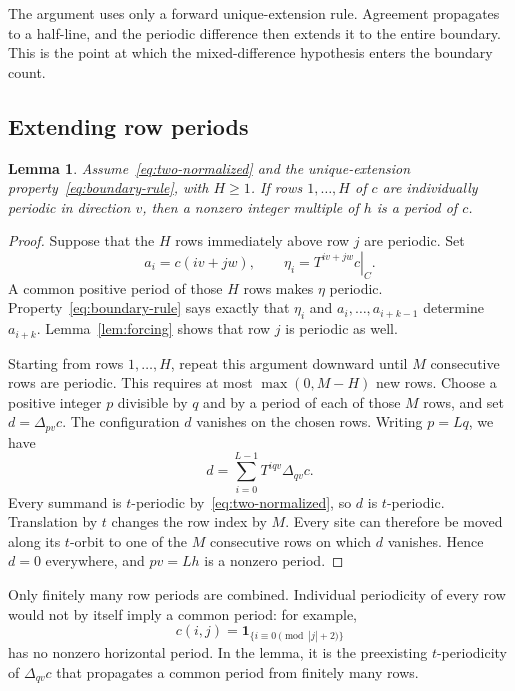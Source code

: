 \documentclass[11pt,a4paper,reqno]{amsart}
\newtheorem{lemma}[theorem]{Lemma}
\theoremstyle{remark}
\newcommand{\De}{\Delta}
\newcommand{\restr}[2]{\left.#1\right|_{#2}}
\numberwithin{equation}{section}
\begin{document}
The argument uses only a forward unique-extension rule. Agreement propagates to a half-line, and the periodic difference then extends it to the entire boundary. This is the point at which the mixed-difference hypothesis enters the boundary count.

\subsection{Extending row periods}
\begin{lemma}\label{lem:row-lifting}
Assume~\eqref{eq:two-normalized} and the unique-extension property~\eqref{eq:boundary-rule}, with $H\ge1$. If rows $1,\ldots,H$ of $c$ are individually periodic in direction $v$, then a nonzero integer multiple of $h$ is a period of $c$.
\end{lemma}
\begin{proof}
Suppose that the $H$ rows immediately above row $j$ are periodic. Set
\[
 a_i=c(iv+jw),\qquad \eta_i=\restr{T^{iv+jw}c}{C}.
\]
A common positive period of those $H$ rows makes $\eta$ periodic. Property~\eqref{eq:boundary-rule} says exactly that $\eta_i$ and $a_i,\ldots,a_{i+k-1}$ determine $a_{i+k}$. Lemma~\ref{lem:forcing} shows that row $j$ is periodic as well.

Starting from rows $1,\ldots,H$, repeat this argument downward until $M$ consecutive rows are periodic. This requires at most $\max(0,M-H)$ new rows. Choose a positive integer $p$ divisible by $q$ and by a period of each of those $M$ rows, and set $d=\De_{pv}c$. The configuration $d$ vanishes on the chosen rows. Writing $p=Lq$, we have
\begin{equation}\label{eq:telescoping-lift}
 d=\sum_{i=0}^{L-1}T^{iqv}\De_{qv}c.
\end{equation}
Every summand is $t$-periodic by~\eqref{eq:two-normalized}, so $d$ is $t$-periodic. Translation by $t$ changes the row index by $M$. Every site can therefore be moved along its $t$-orbit to one of the $M$ consecutive rows on which $d$ vanishes. Hence $d=0$ everywhere, and $pv=Lh$ is a nonzero period.
\end{proof}

Only finitely many row periods are combined. Individual periodicity of every row would not by itself imply a common period: for example,
\[
 c(i,j)=\mathbf1_{\{i\equiv0\pmod{|j|+2}\}}
\]
has no nonzero horizontal period. In the lemma, it is the preexisting $t$-periodicity of $\De_{qv}c$ that propagates a common period from finitely many rows.
\end{document}
